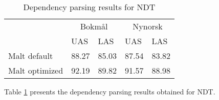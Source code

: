 \documentclass[11pt,a4paper]{article}
\begin{document}


\begin{table}
\centering
\begin{tabular}{lll|ll}
\hline
& \multicolumn{2}{c}{Bokm{\aa}l} & \multicolumn{2}{c}{Nynorsk}\\
 & UAS & LAS  & UAS & LAS \\\hline
Malt default & 88.27 & 85.03 & 87.54 & 83.82\\
Malt optimized & 92.19 & 89.82 & 91.57 & 88.98\\\hline
\end{tabular}
\caption{Dependency parsing results for NDT}
  \label{tb:parsing}
\end{table}

Table \ref{tb:parsing} presents the dependency parsing results obtained for NDT.


\clearpage

\end{document}
